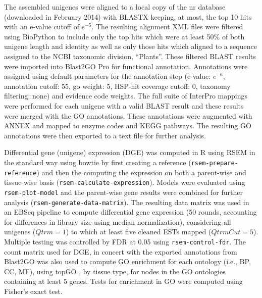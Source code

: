 \documentclass[11pt]{article}
\begin{document}
The assembled unigenes were aligned to a local copy of the nr database
(downloaded in February 2014) with BLASTX \citep{citeulike:238188}
keeping, at most, the top 10 hits with an e-value cutoff of
$e^{-5}$. The resulting alignment XML files were filtered using
BioPython \citep[v.\ 1.6.4]{citeulike:4202607} to include only the top
hits which were at least 50\% of both unigene length and identity as
well as only those hits which aligned to a sequence assigned to the
NCBI taxonomic division, ``Plants''. These filtered BLAST results were
imported into Blast2GO Pro \citep[v.\ 2.7.2,
bg2\_may14]{citeulike:2733895} for functional annotation.  Annotations
were assigned using default parameters for the annotation step
(e-value: $e^{-6}$, annotation cutoff: 55, go weight: 5, HSP-hit
coverage cutoff: 0, taxonomy filtering: none) and evidence code
weights. The full suite of InterPro \citep{citeulike:12942060}
mappings were performed for each unigene with a valid BLAST result and
these results were merged with the GO annotations.  These annotations
were augmented with ANNEX \citep{annex} and mapped to enzyme codes and
KEGG \citep{citeulike:9172127} pathways. The resulting GO annotations
were then exported to a text file for further analysis.

Differential gene (unigene) expression (DGE) was computed in R
\citep[v. 3.1.1]{R} using RSEM
\citep[v. 1.2.15]{Li:BmcBioinformatics:2011} in the standard way using
bowtie \citep[v. 2.2.3]{Langmead:NatMethods:2012} by first creating a
reference (\texttt{rsem-prepare-reference}) and then the computing the
expression on both a parent-wise and tissue-wise basis
(\texttt{rsem-calculate-expression}). Models were evaluated using
\texttt{rsem-plot-model} and the parent-wise gene results were
combined for further analysis
(\texttt{rsem-generate-data-matrix}). The resulting data matrix was
used in an EBSeq \citep{Leng:Bioinformatics:2013} pipeline to compute
differential gene expression (50 rounds, accounting for differences in
library size using median normalization), considering all unigenes
($Qtrm=1$) to which at least five cleaned ESTs mapped
($QtrmCut=5$). Multiple testing was controlled by FDR
\citep{benjamini1995controlling} at 0.05 using
\texttt{rsem-control-fdr}.  The count matrix used for DGE, in concert
with the exported annotations from Blast2GO was also used to compute
GO enrichment for each ontology (i.e., BP, CC, MF), using topGO
\citep{topgo}, by tissue type, for nodes in the GO ontologies containing 
at least 5 genes.  Tests for enrichment in GO were computed using 
Fisher's exact test.
\end{document}
